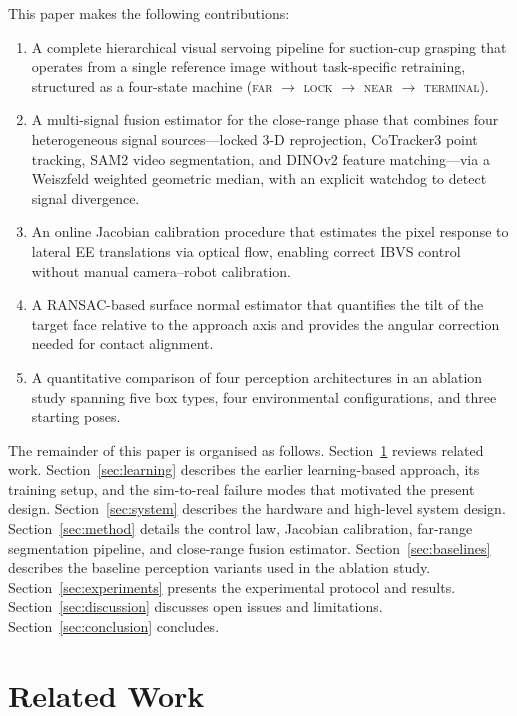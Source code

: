 \documentclass[lettersize,journal]{IEEEtran}
\begin{document}
This paper makes the following contributions:
\begin{enumerate}
  \item A complete hierarchical visual servoing pipeline for suction-cup
        grasping that operates from a single reference image without
        task-specific retraining, structured as a four-state machine
        (\textsc{far} $\to$ \textsc{lock} $\to$ \textsc{near} $\to$
        \textsc{terminal}).
  \item A multi-signal fusion estimator for the close-range phase that
        combines four heterogeneous signal sources---locked 3-D reprojection,
        CoTracker3 point tracking, SAM2 video segmentation, and DINOv2
        feature matching---via a Weiszfeld weighted geometric median, with
        an explicit watchdog to detect signal divergence.
  \item An online Jacobian calibration procedure that estimates the pixel
        response to lateral EE translations via optical flow, enabling
        correct IBVS control without manual camera--robot calibration.
  \item A RANSAC-based surface normal estimator that quantifies the tilt
        of the target face relative to the approach axis and provides the
        angular correction needed for contact alignment.
  \item A quantitative comparison of four perception architectures in an
        ablation study spanning five box types, four environmental
        configurations, and three starting poses.
\end{enumerate}

The remainder of this paper is organised as follows.
Section~\ref{sec:related} reviews related work.
Section~\ref{sec:learning} describes the earlier learning-based approach,
its training setup, and the sim-to-real failure modes that motivated the
present design.
Section~\ref{sec:system} describes the hardware and high-level system design.
Section~\ref{sec:method} details the control law, Jacobian calibration,
far-range segmentation pipeline, and close-range fusion estimator.
Section~\ref{sec:baselines} describes the baseline perception variants used
in the ablation study.
Section~\ref{sec:experiments} presents the experimental protocol and results.
Section~\ref{sec:discussion} discusses open issues and limitations.
Section~\ref{sec:conclusion} concludes.


\section{Related Work}
\label{sec:related}
\end{document}
